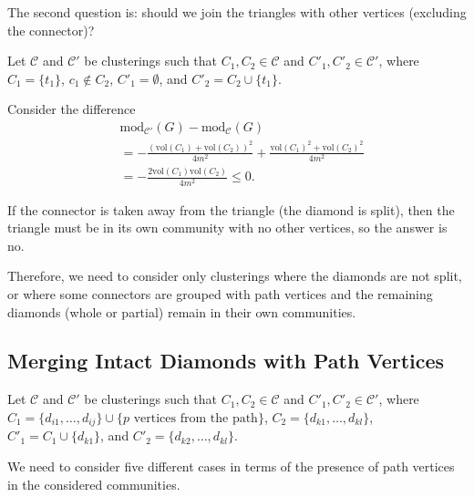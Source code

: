 \documentclass[letterpaper,12pt]{article}
\begin{document}
The second question is: should we join the triangles with other vertices (excluding the connector)?

Let $\mathcal{C}$ and $\mathcal{C'}$ be clusterings such that $C_1, C_2 \in \mathcal{C}$ and $C'_1, C'_2 \in \mathcal{C'}$, where $C_1 = \{t_1\}$, $c_1 \notin C_2$, $C'_1 = \emptyset$, and $C'_2 = C_2 \cup \{t_{1}\}$.

Consider the difference
\begin{align*}
       & \text{mod}_{\mathcal{C'}}(G) - \text{mod}_{\mathcal{C}} (G)                                                \\
       & = -\frac{(\text{vol}(C_1) + \text{vol}(C_2))^2}{4m^2} + \frac{\text{vol}(C_1)^2 + \text{vol}(C_2)^2}{4m^2} \\
       & = - \frac{2\text{vol}(C_1)\text{vol}(C_2)}{4m^2} \leq 0.
\end{align*}

If the connector is taken away from the triangle (the diamond is split), then the triangle must be in its own community with no other vertices, so the answer is no.

Therefore, we need to consider only clusterings where the diamonds are not split, or where some connectors are grouped with path vertices and the remaining diamonds (whole or partial) remain in their own communities.

\subsection{Merging Intact Diamonds with Path Vertices}\label{merging_intact_diamonds_with_path_vertices}
Let $\mathcal{C}$ and $\mathcal{C'}$ be clusterings such that $C_1, C_2 \in \mathcal{C}$ and $C'_1, C'_2 \in \mathcal{C'}$, where $C_1 = \{d_{i1}, \ldots, d_{ij}\} \cup \{\text{$p$ vertices from the path}\}$, $C_2 = \{d_{k1}, \ldots, d_{kl}\}$, $C'_1 = C_1 \cup \{d_{k1}\}$, and $C'_2 = \{d_{k2}, \ldots, d_{kl}\}$.

We need to consider five different cases in terms of the presence of path vertices in the considered communities.
\end{document}
